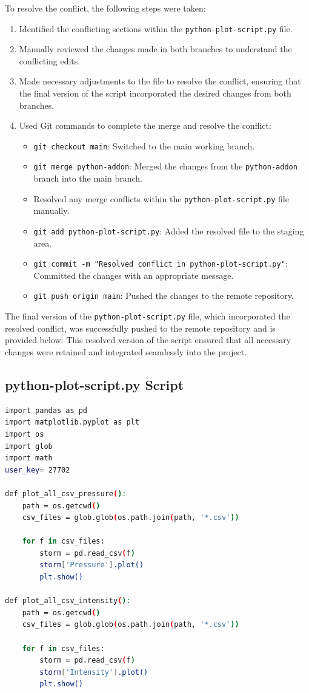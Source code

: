 \documentclass[]{article}
\begin{document}
To resolve the conflict, the following steps were taken:

\begin{enumerate}
    \item Identified the conflicting sections within the \texttt{python-plot-script.py} file.
    \item Manually reviewed the changes made in both branches to understand the conflicting edits.
    \item Made necessary adjustments to the file to resolve the conflict, ensuring that the final version of the script incorporated the desired changes from both branches.
    \item Used Git commands to complete the merge and resolve the conflict:
    \begin{itemize}
        \item \texttt{git checkout main}: Switched to the main working branch.
        \item \texttt{git merge python-addon}: Merged the changes from the \texttt{python-addon} branch into the main branch.
        \item Resolved any merge conflicts within the \texttt{python-plot-script.py} file manually.
        \item \texttt{git add python-plot-script.py}: Added the resolved file to the staging area.
        \item \texttt{git commit -m "Resolved conflict in python-plot-script.py"}: Committed the changes with an appropriate message.
        \item \texttt{git push origin main}: Pushed the changes to the remote repository.
    \end{itemize}
\end{enumerate}

The final version of the \texttt{python-plot-script.py} file, which incorporated the resolved conflict, was successfully pushed to the remote repository and is provided below: This resolved version of the script ensured that all necessary changes were retained and integrated seamlessly into the project.

\subsection{python-plot-script.py Script}
\begin{lstlisting}[language=bash, caption={python-plot-script.py}]
import pandas as pd
import matplotlib.pyplot as plt
import os
import glob
import math
user_key= 27702

def plot_all_csv_pressure():
    path = os.getcwd()
    csv_files = glob.glob(os.path.join(path, '*.csv'))
    
    for f in csv_files:
        storm = pd.read_csv(f)
        storm['Pressure'].plot()
        plt.show()

def plot_all_csv_intensity():
    path = os.getcwd()
    csv_files = glob.glob(os.path.join(path, '*.csv'))
    
    for f in csv_files:
        storm = pd.read_csv(f)
        storm['Intensity'].plot()
        plt.show()
\end{lstlisting}
\end{document}
